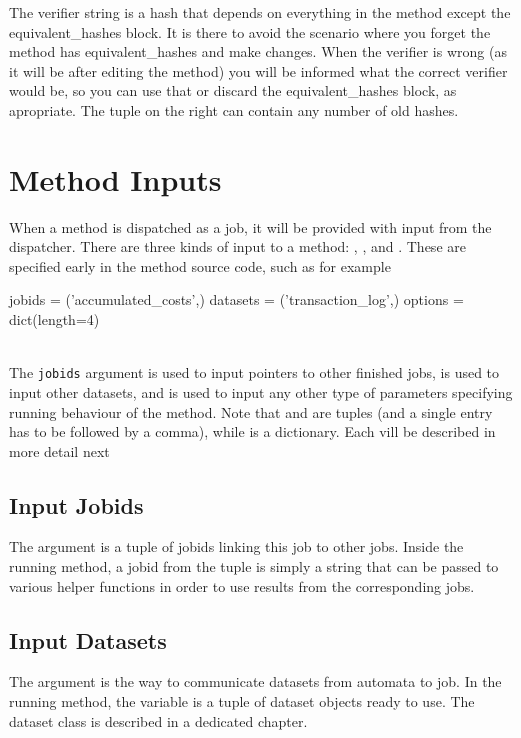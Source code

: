 The verifier string is a hash that depends on everything in the method
except the equivalent\_hashes block. It is there to avoid the scenario
where you forget the method has equivalent\_hashes and make changes. When
the verifier is wrong (as it will be after editing the method) you will be
informed what the correct verifier would be, so you can use that or discard
the equivalent\_hashes block, as apropriate. The tuple on the right can
contain any number of old hashes.



\section{Method Inputs}

When a method is dispatched as a job, it will be provided with input
from the dispatcher.  There are three kinds of input to a method:
\jobids, \datasets, and \options.  These are specified early in the
method source code, such as for example
\\
\begin{python}
jobids = ('accumulated_costs',)
datasets = ('transaction_log',)
options = dict(length=4)
\end{python}
\\
The \texttt{jobids} argument is used to input pointers to other
finished jobs, \datasets is used to input other datasets, and \options
is used to input any other type of parameters specifying running
behaviour of the method.  Note that \jobids and \datasets are tuples
(and a single entry has to be followed by a comma), while \options is
a dictionary.  Each vill be described in more detail next



\subsection{Input Jobids}
The \jobids argument is a tuple of jobids linking this job to other
jobs.  Inside the running method, a jobid from the \jobids tuple is
simply a string that can be passed to various helper functions in
order to use results from the corresponding jobs.



\subsection{Input Datasets}
The \datasets argument is the way to communicate datasets from
automata to job.  In the running method, the \datasets variable is a
tuple of dataset objects ready to use.  The dataset class is described
in a dedicated chapter.




